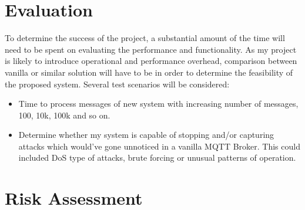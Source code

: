 \documentclass[a4paper,12pt]{article}
\begin{document}
\section*{Evaluation}
To determine the success of the project, a substantial amount of the time will need to be spent on evaluating the performance and functionality. As my project is likely to introduce operational and performance overhead, comparison between vanilla or similar solution will have to be in order to determine the feasibility of the proposed system. Several test scenarios will be considered:
\begin{itemize}
  \item Time to process messages of new system with increasing number of messages, 100, 10k, 100k and so on.
  \item Determine whether my system is capable of stopping and/or capturing attacks which would've gone unnoticed in a vanilla MQTT Broker. This could included DoS type of attacks, brute forcing or unusual patterns of operation.
\end{itemize}

\section*{Risk Assessment}
\end{document}
